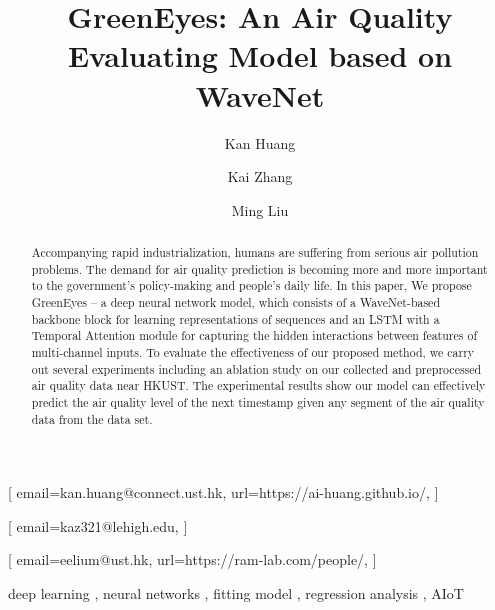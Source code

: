 \documentclass[
twocolumn,
]{ceurart}
\begin{document}


\title{GreenEyes: An Air Quality Evaluating Model based on WaveNet}

\author[1]{Kan Huang}[%
email=kan.huang@connect.ust.hk,
url=https://ai-huang.github.io/,
]
\address[1]{The Hong Kong University of Science and Technology, Clearwater Bay, Hong Kong, China}

\author[2]{Kai Zhang}[%
email=kaz321@lehigh.edu,
]
\address[2]{Lehigh University, 27 Memorial Dr W, Bethlehem, PA 18015, Bethlehem, United States}

\author[3]{Ming Liu}[%
email=eelium@ust.hk,
url=https://ram-lab.com/people/,
]
\address[3]{The Hong Kong University of Science and Technology, Clearwater Bay, Hong Kong, China}

\begin{abstract}
  Accompanying rapid industrialization, humans are suffering from serious air pollution problems. The demand for air quality prediction is becoming more and more important to the government's policy-making and people's daily life. In this paper, We propose GreenEyes -- a deep neural network model, which consists of a WaveNet-based backbone block for learning representations of sequences and an LSTM with a Temporal Attention module for capturing the hidden interactions between features of multi-channel inputs. To evaluate the effectiveness of our proposed method, we carry out several experiments including an ablation study on our collected and preprocessed air quality data near HKUST. The experimental results show our model can effectively predict the air quality level of the next timestamp given any segment of the air quality data from the data set.
\end{abstract}

\begin{keywords}
  deep learning \sep
  neural networks \sep
  fitting model \sep
  regression analysis \sep
  AIoT
\end{keywords}
\end{document}
